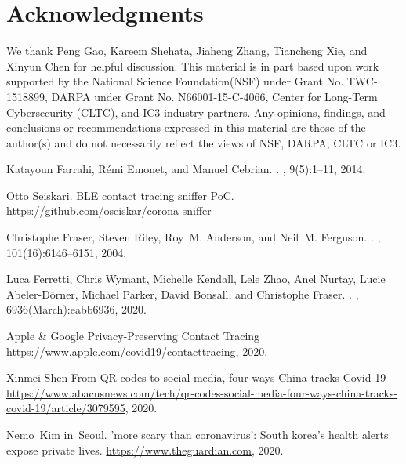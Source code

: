 \documentclass[11pt,dvipdfmx]{article}  %
\begin{document}
\section*{Acknowledgments}
We thank Peng Gao, Kareem Shehata, Jiaheng Zhang, Tiancheng Xie, and Xinyun Chen for helpful discussion. This material is in part based upon work supported by the National Science Foundation(NSF) under Grant No. TWC-1518899, DARPA under Grant No. N66001-15-C-4066, Center for Long-Term Cybersecurity (CLTC), and IC3 industry partners. Any opinions, findings, and conclusions or recommendations expressed in this material are those of the author(s) and do not necessarily reflect the views of NSF, DARPA, CLTC or IC3.


\begin{thebibliography}{10}
\itemsep=1pt
\begin{small}

Katayoun Farrahi, R{\'{e}}mi Emonet, and Manuel Cebrian.
.
, 9(5):1--11, 2014.

 Otto Seiskari. \newblock
 BLE contact tracing sniffer PoC. \newblock \url{https://github.com/oseiskar/corona-sniffer} 
 
Christophe Fraser, Steven Riley, Roy~M. Anderson, and Neil~M. Ferguson. 
.
, 101(16):6146--6151, 2004.

Luca Ferretti, Chris Wymant, Michelle Kendall, Lele Zhao, Anel Nurtay, Lucie
  Abeler-D{\"{o}}rner, Michael Parker, David Bonsall, and Christophe Fraser.
.
, 6936(March):eabb6936, 2020.

 Apple \& Google
\newblock Privacy-Preserving Contact Tracing
\newblock \url{https://www.apple.com/covid19/contacttracing}, 2020.

 Xinmei Shen
\newblock From QR codes to social media, four ways China tracks Covid-19
\newblock \url{https://www.abacusnews.com/tech/qr-codes-social-media-four-ways-china-tracks-covid-19/article/3079595}, 2020.

Nemo~Kim in~Seoul.
\newblock 'more scary than coronavirus': South korea's health alerts expose
  private lives.
\newblock
  \url{https://www.theguardian.com},
  2020.


\end{small}
\end{thebibliography}
\end{document}

